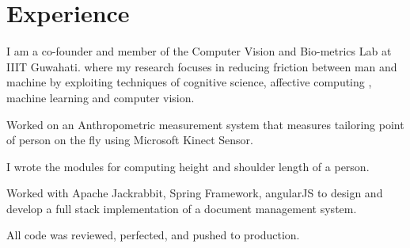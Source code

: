 

\section{Experience}
I am a co-founder and member of the Computer Vision and Bio-metrics Lab at IIIT Guwahati. where my research focuses in reducing friction between man and machine by exploiting techniques of cognitive science, affective computing , machine learning and computer vision.
\sectionsep

\begin{tightemize}
\item Worked on an Anthropometric measurement system that measures tailoring point of person on the fly using Microsoft Kinect Sensor.
\item I wrote the modules for computing height and shoulder length of a person.
\end{tightemize}
\sectionsep

\begin{tightemize}
\item Worked with Apache Jackrabbit, Spring Framework, angularJS to design and develop a full stack implementation of a document management system. 
\item All code was reviewed, perfected, and pushed to production.
\end{tightemize}
\sectionsep